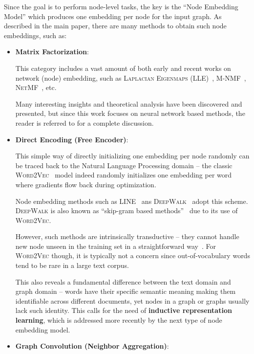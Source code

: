 \documentclass{article}
\newcommand{\wv}{\textsc{Word2Vec}\xspace}
\begin{document}
Since the goal is to perform node-level tasks, the key is the ``Node Embedding Model'' which produces one embedding per node for the input graph. As described in the main paper, there are many methods to obtain such node embeddings, such as:
\begin{itemize}
    \item \textbf{{Matrix Factorization}}:
    
    This category includes a vast amount of both early and recent works on network (node) embedding, such as \textsc{Laplacian Eigenmaps (LLE)}~\cite{belkin2003laplacian}, \textsc{M-NMF}~\cite{wang2017community}, \textsc{NetMF}~\cite{qiu2017network}, etc. 
    
    Many interesting insights and theoretical analysis have been discovered and presented, but since this work focuses on neural network based methods, the reader is referred to \cite{qiu2017network} for a complete discussion.
    
    \item \textbf{{Direct Encoding (Free Encoder)}}: 
    
    This simple way of directly initializing one embedding per node randomly can be traced back to the Natural Language Processing domain -- the classic \wv~\cite{mikolov2013distributed} model indeed randomly initializes one embedding per word where gradients flow back during optimization. 
    
    Node embedding methods such as \textsc{LINE}~\cite{tang2015line} ans \textsc{DeepWalk}~\cite{perozzi2014deepwalk} adopt this scheme. \textsc{DeepWalk} is also known as ``skip-gram based methods''~\cite{du2018dynamic} due to its use of \wv.
    
    However, such methods are intrinsically transductive -- they cannot handle new node unseen in the training set in a straightforward way~\cite{hamilton2017inductive}. For \wv though, it is typically not a concern since out-of-vocabulary words tend to be rare in a large text corpus. 
    
    This also reveals a fundamental difference between the text domain and graph domain -- words have their specific semantic meaning making them identifiable across different documents, yet nodes in a graph or graphs usually lack such identity. This calls for the need of \textbf{{inductive representation learning}}, which is addressed more recently by the next type of node embedding model.
    
    \item \textbf{{Graph Convolution (Neighbor Aggregation)}}: 
    

\end{itemize}
\end{document}
